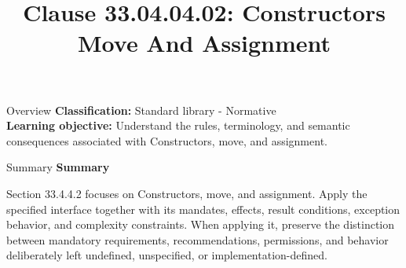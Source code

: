 \documentclass[10pt,letterpaper]{article}
\title{Clause 33.04.04.02: Constructors Move And Assignment}
\author{}
\date{}
\begin{document}
\maketitle
\begin{CornellOverviewBox}{Overview}
\textbf{Classification:} Standard library - Normative\\[2pt]
\textbf{Learning objective:} Understand the rules, terminology, and semantic consequences associated with Constructors, move, and assignment.
\end{CornellOverviewBox}\begin{CornellSummaryBox}{Summary}
{\sffamily\bfseries\color{Accent} Summary}\par\vspace{3pt}Section 33.4.4.2 focuses on Constructors, move, and assignment. Apply the specified interface together with its mandates, effects, result conditions, exception behavior, and complexity constraints. When applying it, preserve the distinction between mandatory requirements, recommendations, permissions, and behavior deliberately left undefined, unspecified, or implementation-defined.
\end{CornellSummaryBox}
\end{document}
